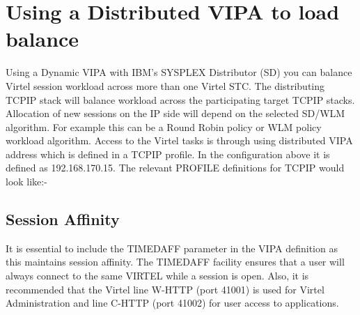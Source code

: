 \documentclass[letterpaper,10pt,english]{sphinxmanual}
\begin{document}
\section{Using a Distributed VIPA to load balance}
\label{\detokenize{connectivity_guide:index-173}}\label{\detokenize{connectivity_guide:using-a-distributed-vipa-to-load-balance}}
Using a Dynamic VIPA with IBM’s SYSPLEX Distributor (SD) you can balance Virtel session workload across more than one Virtel STC. The distributing TCPIP stack will balance workload across the participating target TCPIP stacks. Allocation of new sessions on the IP side will depend on the selected SD/WLM algorithm. For example this can be a Round Robin policy or WLM policy workload algorithm. Access to the Virtel tasks is through using distributed VIPA address which is defined in a TCPIP profile. In the configuration above it is defined as
192.168.170.15. The relevant PROFILE definitions for TCPIP would look like:-

\begin{sphinxVerbatim}[commandchars=\\\{\}]
     
    
      
 
\end{sphinxVerbatim}


\subsection{Session Affinity}
\label{\detokenize{connectivity_guide:session-affinity}}\label{\detokenize{connectivity_guide:index-174}}
It is essential to include the TIMEDAFF parameter in the VIPA definition as this maintains session affinity. The TIMEDAFF facility ensures that a user will always connect to the same VIRTEL while a session is open. Also, it is recommended that the Virtel line W-HTTP (port 41001) is used for Virtel Administration and line C-HTTP (port 41002) for user access
to applications.
\end{document}
